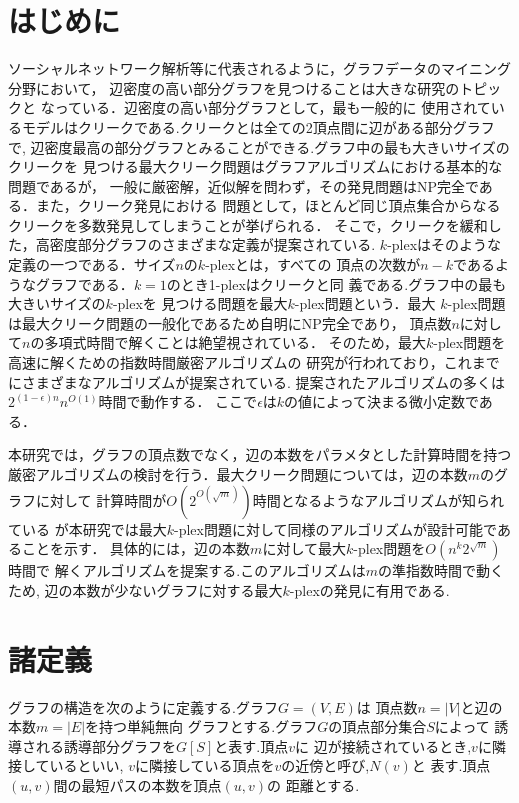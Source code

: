 \documentclass[a4j,twoside]{jarticle}
\begin{document}
\twocolumn[\vspace*{9mm}]     %
\begin{論文概要}              %
\setcounter{page}{2}          %

\section{はじめに}
ソーシャルネットワーク解析等に代表されるように，グラフデータのマイニング分野において，
辺密度の高い部分グラフを見つけることは大きな研究のトピックと
なっている\cite{washio2003state}．辺密度の高い部分グラフとして，最も一般的に
使用されているモデルはクリークである.クリークとは全ての2頂点間に辺がある部分グラフで,
辺密度最高の部分グラフとみることができる.グラフ中の最も大きいサイズのクリークを
見つける最大クリーク問題はグラフアルゴリズムにおける基本的な問題であるが，
一般に厳密解，近似解を問わず，その発見問題はNP完全である．また，クリーク発見における
問題として，ほとんど同じ頂点集合からなるクリークを多数発見してしまうことが挙げられる．
そこで，クリークを緩和した，高密度部分グラフのさまざまな定義が提案されている.
$k$-plexはそのような定義の一つである．サイズ$n$の$k$-plexとは，すべての
頂点の次数が$n-k$であるようなグラフである．$k=1$のとき1-plexはクリークと同
義である.グラフ中の最も大きいサイズの$k$-plexを
見つける問題を最大$k$-plex問題という．最大
$k$-plex問題は最大クリーク問題の一般化であるため自明にNP完全であり，
頂点数$n$に対して$n$の多項式時間で解くことは絶望視されている．
そのため，最大$k$-plex問題を高速に解くための指数時間厳密アルゴリズムの
研究が行われており，これまでにさまざまなアルゴリズムが提案されている.
提案されたアルゴリズムの多くは$2^{(1-\epsilon)n}n^{O(1)}$時間で動作する．
ここで$\epsilon$は$k$の値によって決まる微小定数である．

本研究では，グラフの頂点数でなく，辺の本数をパラメタとした計算時間を持つ
厳密アルゴリズムの検討を行う．最大クリーク問題については，辺の本数$m$のグラフに対して
計算時間が$O(2^{O(\sqrt{m})})$時間となるようなアルゴリズムが知られている \cite{fomin2010exact} 
が本研究では最大$k$-plex問題に対して同様のアルゴリズムが設計可能であることを示す．
具体的には，辺の本数$m$に対して最大$k$-plex問題を$O(n^{k}2^{\sqrt{m}})$時間で
解くアルゴリズムを提案する.このアルゴリズムは$m$の準指数時間で動くため,
辺の本数が少ないグラフに対する最大$k$-plexの発見に有用である.  

\section{諸定義}
グラフの構造を次のように定義する.グラフ$G=(V,E)$は
頂点数$n=|V|$と辺の本数$m=|E|$を持つ単純無向
グラフとする.グラフ$G$の頂点部分集合$S$によって
誘導される誘導部分グラフを$G[S]$と表す.頂点$v$に
辺が接続されているとき,$v$に隣接しているといい,
$v$に隣接している頂点を$v$の近傍と呼び,$N(v)$と
表す.頂点$(u,v)$間の最短パスの本数を頂点$(u,v)$の
距離とする.


\end{論文概要}
\end{document}

